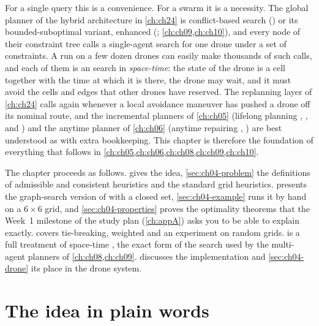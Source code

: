 For a single query this is a convenience. For a swarm it is a necessity. The
global planner of the hybrid architecture in \cref{ch:ch24} is
conflict-based search (\cbs) or its bounded-suboptimal variant, enhanced \cbs
(\ecbs; \cref{ch:ch09,ch:ch10}), and every node of their constraint tree calls a
single-agent search for one drone under a set of constraints. A run on a few
dozen drones can easily make thousands of such calls, and each of them is an
\astar search in \emph{space-time}: the state of the drone is a cell together
with the time at which it is there, the drone may wait, and it must avoid the
cells and edges that other drones have reserved. The replanning layer of
\cref{ch:ch24} calls \astar again whenever a local avoidance maneuver has
pushed a drone off its nominal route, and the incremental planners of
\cref{ch:ch05} (lifelong planning \astar, \lpastar, and \dstarlite) and the
anytime planner of \cref{ch:ch06} (anytime repairing \astar, \arastar) are best
understood as \astar with extra bookkeeping. This chapter is
therefore the foundation of everything that follows in \cref{ch:ch05,ch:ch06,ch:ch08,ch:ch09,ch:ch10}.

The chapter proceeds as follows.  gives the idea,
\cref{sec:ch04-problem} the definitions of admissible and consistent heuristics
and the standard grid heuristics.  presents the
graph-search version of \astar with a closed set, \cref{sec:ch04-example} runs
it by hand on a $6 \times 6$ grid, and \cref{sec:ch04-properties} proves the
optimality theorems that the Week~1 milestone of the study plan
(\cref{ch:appA}) asks you to be able to explain exactly. 
covers tie-breaking, weighted \astar and an experiment on random grids.
 is a full treatment of space-time \astar, the exact
form of the search used by the multi-agent planners of \cref{ch:ch08,ch:ch09}.
 discusses the implementation and
\cref{sec:ch04-drone} its place in the drone system.

\section{The idea in plain words}
\label{sec:ch04-intuition}

